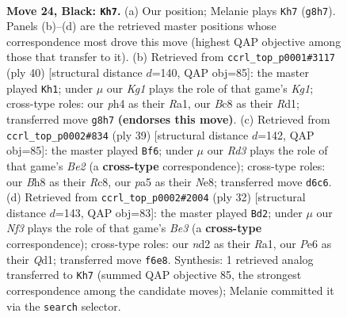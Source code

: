 \documentclass[11pt]{article}
\begin{document}
\clearpage

\begin{figure}[p]\centering
\begin{subfigure}{0.46\textwidth}\centering
\resizebox{\linewidth}{!}{%
\newchessgame
\chessboard[
  setfen={rnb3kb/pp2qp2/3rpnp1/PQ1p3p/3P3P/1B2B1P1/RPPN1P2/1N2R1K1 b - - 2 24},
  showmover=false,
  pgfstyle=straightmove, color=movearrow, markmove={g8-h7}
]}
\caption{}
\end{subfigure}\hfill
\begin{subfigure}{0.46\textwidth}\centering
\resizebox{\linewidth}{!}{%
\newchessgame
\chessboard[
  setfen={r2r2k1/1p3pp1/2p1p1n1/p4bqp/2PPp3/PP2P3/1Q2BPPP/R2R1NK1 w - - 0 21},
  showmover=false,
  pgfstyle=straightmove, color=movearrow, markmove={g1-h1}
]}
\caption{}
\end{subfigure}
\\[4pt]
\begin{subfigure}{0.46\textwidth}\centering
\resizebox{\linewidth}{!}{%
\newchessgame
\chessboard[
  setfen={2r1nrk1/2q1bppp/p1bpp3/1p6/3BPP2/P1NR1BQ1/1PP3PP/5RK1 b - - 10 20},
  showmover=false,
  pgfstyle=straightmove, color=movearrow, markmove={e7-f6}
]}
\caption{}
\end{subfigure}\hfill
\begin{subfigure}{0.46\textwidth}\centering
\resizebox{\linewidth}{!}{%
\newchessgame
\chessboard[
  setfen={r2qkb1r/1p3pp1/p3p1np/3pP3/Pn1PbP2/1N2B2R/1P2B1PP/R2QN1K1 w kq - 9 17},
  showmover=false,
  pgfstyle=straightmove, color=movearrow, markmove={e3-d2}
]}
\caption{}
\end{subfigure}
\caption{\textbf{Move 24, Black: \texttt{Kh7}.} (a) Our position; Melanie plays \texttt{Kh7} (\texttt{g8h7}). Panels (b)--(d) are the retrieved master positions whose correspondence most drove this move (highest QAP objective among those that transfer to it). (b) Retrieved from \texttt{ccrl\_top\_p0001\#3117} (ply 40) [structural distance $d$=140, QAP obj=85]: the master played \texttt{Kh1}; under $\mu$ our \emph{Kg1} plays the role of that game's \emph{Kg1}; cross-type roles: our \emph{p}h4 as their \emph{R}a1, our \emph{B}c8 as their \emph{R}d1; transferred move \texttt{g8h7} \textbf{(endorses this move)}. (c) Retrieved from \texttt{ccrl\_top\_p0002\#834} (ply 39) [structural distance $d$=142, QAP obj=85]: the master played \texttt{Bf6}; under $\mu$ our \emph{Rd3} plays the role of that game's \emph{Be2} (a \textbf{cross-type} correspondence); cross-type roles: our \emph{B}h8 as their \emph{R}c8, our \emph{p}a5 as their \emph{N}e8; transferred move \texttt{d6c6}. (d) Retrieved from \texttt{ccrl\_top\_p0002\#2004} (ply 32) [structural distance $d$=143, QAP obj=83]: the master played \texttt{Bd2}; under $\mu$ our \emph{Nf3} plays the role of that game's \emph{Be3} (a \textbf{cross-type} correspondence); cross-type roles: our \emph{n}d2 as their \emph{R}a1, our \emph{P}e6 as their \emph{Q}d1; transferred move \texttt{f6e8}. Synthesis: 1 retrieved analog transferred to \texttt{Kh7} (summed QAP objective 85, the strongest correspondence among the candidate moves); Melanie committed it via the \texttt{search} selector.}
\label{fig:thought-m47}
\end{figure}
\end{document}
